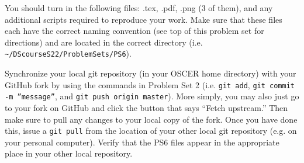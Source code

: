 \documentclass[12pt,english]{exam}
\begin{document}
\begin{questions}
\question You should turn in the following files: .tex, .pdf, .png (3 of them), and any additional scripts required to reproduce your work.  Make sure that these files each have the correct naming convention (see top of this problem set for directions) and are located in the correct directory (i.e. \texttt{\textasciitilde/DScourseS22/ProblemSets/PS6}).

\question Synchronize your local git repository (in your OSCER home directory) with your GitHub fork by using the commands in Problem Set 2 (i.e. \texttt{git add}, \texttt{git commit -m ''message''}, and \texttt{git push origin master}). More simply, you may also just go to your fork on GitHub and click the button that says ``Fetch upstream.'' Then make sure to pull any changes to your local copy of the fork. Once you have done this, issue a \texttt{git pull} from the location of your other local git repository (e.g. on your personal computer). Verify that the PS6 files appear in the appropriate place in your other local repository.

\end{questions}
\end{document}
